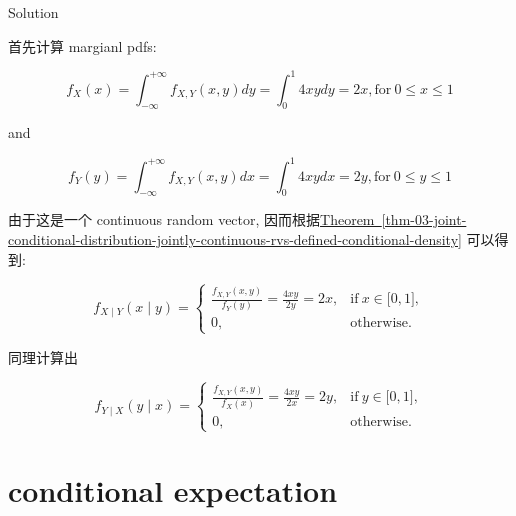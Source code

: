 \documentclass{qlnotes-export}
\begin{document}
\begin{qlsolution}{Solution}

首先计算 margianl pdfs:

\[f_{X}(x) = \int_{- \infty}^{+ \infty}f_{X,Y}(x,y)dy = \int_{0}^{1}4xydy = 2x,\text{for}\ 0 \leq x \leq 1\]

and

\[f_{Y}(y) = \int_{- \infty}^{+ \infty}f_{X,Y}(x,y)dx = \int_{0}^{1}4xydx = 2y,\text{for}\ 0 \leq y \leq 1\]

由于这是一个 continuous random vector, 因而根据\hyperref[thm-03-joint-conditional-distribution-jointly-continuous-rvs-defined-conditional-density]{Theorem~\ref*{thm-03-joint-conditional-distribution-jointly-continuous-rvs-defined-conditional-density}} 可以得到:

\[f_{X \mid Y}(x \mid y) = \left\{ \begin{matrix}
{\frac{f_{X,Y}(x,y)}{f_{Y}(y)} = \frac{4xy}{2y} = 2x,} & {\text{if}\ x \in \lbrack 0,1\rbrack,} \\
{0,} & \text{otherwise.}
\end{matrix} \right.\]

同理计算出

\[f_{Y \mid X}(y \mid x) = \left\{ \begin{matrix}
{\frac{f_{X,Y}(x,y)}{f_{X}(x)} = \frac{4xy}{2x} = 2y,} & {\text{if}\ y \in \lbrack 0,1\rbrack,} \\
{0,} & \text{otherwise.}
\end{matrix} \right.\]

\end{qlsolution}

\section{conditional expectation}\label{conditional-expectation}
\end{document}
